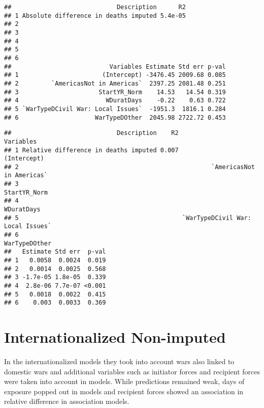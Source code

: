 \documentclass[
]{article}
\begin{document}
\begin{verbatim}
##                             Description      R2
## 1 Absolute difference in deaths imputed 5.4e-05
## 2                                              
## 3                                              
## 4                                              
## 5                                              
## 6                                              
##                           Variables Estimate Std err p-val
## 1                       (Intercept) -3476.45 2009.68 0.085
## 2         `AmericasNot in Americas`  2397.25 2081.48 0.251
## 3                      StartYR_Norm    14.53   14.54 0.319
## 4                        WDuratDays    -0.22    0.63 0.722
## 5 `WarTypeDCivil War: Local Issues`  -1951.3  1816.1 0.284
## 6                     WarTypeDOther  2045.98 2722.72 0.453
\end{verbatim}

\begin{verbatim}
##                             Description    R2                         Variables
## 1 Relative difference in deaths imputed 0.007                       (Intercept)
## 2                                                     `AmericasNot in Americas`
## 3                                                                  StartYR_Norm
## 4                                                                    WDuratDays
## 5                                             `WarTypeDCivil War: Local Issues`
## 6                                                                 WarTypeDOther
##   Estimate Std err  p-val
## 1   0.0058  0.0024  0.019
## 2   0.0014  0.0025  0.568
## 3 -1.7e-05 1.8e-05  0.339
## 4  2.8e-06 7.7e-07 <0.001
## 5   0.0018  0.0022  0.415
## 6    0.003  0.0033  0.369
\end{verbatim}

\hypertarget{internationalized-non-imputed}{%
\section{Internationalized
Non-imputed}\label{internationalized-non-imputed}}

In the internationalized models they took into account wars also linked
to domestic wars and additional variables such as initiator forces and
recipient forces were taken into account in models. While predictions
remained weak, days of exposure popped out in models and recipient
forces showed an association in relative difference in association
models.
\end{document}
